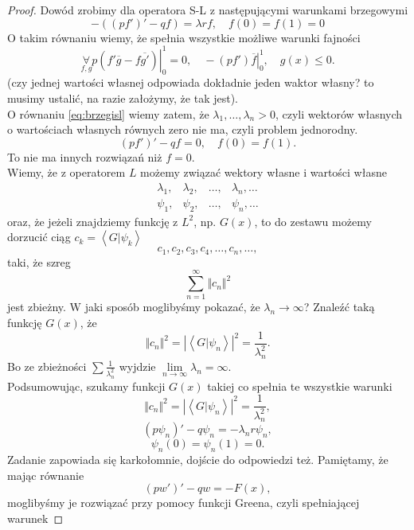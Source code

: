 \documentclass[../main.tex]{subfiles}
\begin{document}
		\begin{proof}
				Dowód zrobimy dla operatora S-L z następującymi warunkami brzegowymi
				\begin{equation}
						-\left( \left( pf' \right) ' - qf \right) = \lambda r f,\quad f(0) = f(1) = 0
						\label{eq:brzegisl}
				\end{equation}
				O takim równaniu wiemy, że spełnia wszystkie możliwe warunki fajności
				\[
						\underset{f,g}{\forall} \left.p\left( f' \overline{g}  - f \overline{g'}  \right)\right|_0^1 = 0,\quad -\left.\left( pf' \right) \overline{f}\right|_0^1,\quad g(x) \le 0
				.\]
				(czy jednej wartości własnej odpowiada dokładnie jeden waktor własny? to musimy ustalić, na razie założymy, że tak jest).\\
				O równaniu \ref{eq:brzegisl} wiemy zatem, że $\lambda_1,\ldots,\lambda_n > 0$, czyli wektorów własnych o wartościach własnych równych zero nie ma, czyli problem jednorodny.
				\[
						\left( pf' \right) ' - qf = 0,\quad f(0) = f(1)
				.\]
				To nie ma innych rozwiązań niż $f = 0$.\\
				Wiemy, że z operatorem $L$ możemy związać wektory własne i wartości własne
				\[
				\begin{matrix}
						\lambda_1,&\lambda_2,&\ldots,&\lambda_n,\ldots\\
						\psi_1,&\psi_2,&\ldots,&\psi_n,\ldots
				\end{matrix}
				\]
				oraz, że jeżeli znajdziemy funkcję z $L^2$, np. $G(x)$, to do zestawu możemy dorzucić ciąg $c_k = \left<G|\psi_k \right>$
				\[
				c_1,c_2,c_3,c_4,\ldots,c_n,\ldots
				,\]
				taki, że szreg
				\[
				\sum_{n=1}^{\infty} \Vert c_n \Vert ^2
				\]
				jest zbieżny. W jaki sposób moglibyśmy pokazać, że
				$\lambda_n\to \infty$? Znaleźć taką funkcję $G(x)$, że
				\[
				\Vert c_n \Vert ^2 = \left| \left<G|\psi_n \right>\right|^2 = \frac{1}{\lambda_n^2}
				.\]
				Bo ze zbieżności $\sum \frac{1}{\lambda_n^2}$ wyjdzie $\lim\limits_{n \to \infty}\lambda_n = \infty$.\\
				Podsumowując, szukamy funkcji $G(x)$ takiej co spełnia te wszystkie warunki
				\[
				\Vert c_n \Vert ^2 = \left| \left<G|\psi_n \right>\right|^2 = \frac{1}{\lambda_n^2}
				,\]
				\[
						\left( p\psi_n \right) ' - q\psi_n = -\lambda_n r \psi_n
				,\]
				\[
						\psi_n(0) = \psi_n(1) = 0
				.\]
				Zadanie zapowiada się karkołomnie, dojście do odpowiedzi też. Pamiętamy, że mając równanie
\[
		\left( pw' \right) ' - qw = -F(x)
,\]
moglibyśmy je rozwiązać przy pomocy funkcji Greena, czyli spełniającej warunek

\end{proof}
\end{document}
